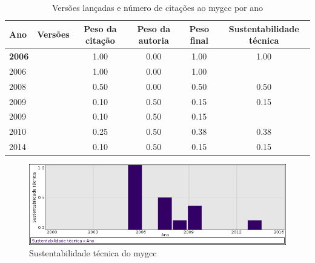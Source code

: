 \begin{table}[H]
\caption{Versões lançadas e número de citações ao mygcc por ano}
\centering
\begin{tabular}{| l | c | c | c | c | c |}
  \hline
  Ano & Versões & Peso da citação & Peso da autoria & Peso final & Sustentabilidade técnica \\
  \hline
            {\bf 2006}
          &
          
          &
          1.00
          &
          0.00
          &
          1.00
          &
            {\color{blue} 1.00}
          \\
            2006
          &
          
          &
          1.00
          &
          0.00
          &
          1.00
          &
          \\
\hline
            2008
          &
          
          &
          0.50
          &
          0.00
          &
          0.50
          &
            {\color{blue} 0.50}
          \\
\hline
            2009
          &
          
          &
          0.10
          &
          0.50
          &
          0.15
          &
            {\color{red} 0.15}
          \\
            2009
          &
          
          &
          0.10
          &
          0.50
          &
          0.15
          &
          \\
\hline
            2010
          &
          
          &
          0.25
          &
          0.50
          &
          0.38
          &
            {\color{red} 0.38}
          \\
\hline
            2014
          &
          
          &
          0.10
          &
          0.50
          &
          0.15
          &
            {\color{red} 0.15}
          \\
\hline
\end{tabular}
\end{table}

\begin{figure}[h]
  \center
  \includegraphics[scale=0.50]{result-documents/charts/mygcc.png}
  \caption{Sustentabilidade técnica do mygcc}
\end{figure}


